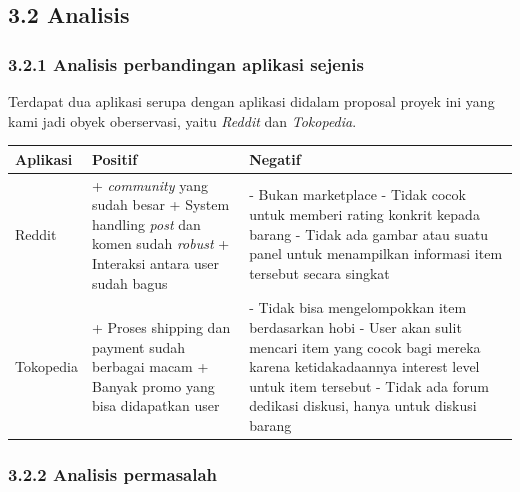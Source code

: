 \documentclass[a4paper]{article}
\begin{document}
\subsection*{3.2 Analisis}

\subsubsection*{3.2.1 Analisis perbandingan aplikasi sejenis}
Terdapat dua aplikasi serupa dengan aplikasi didalam proposal proyek ini yang kami jadi obyek oberservasi, yaitu \textit{Reddit} dan \textit{Tokopedia}.

\begin{longtable}{|m{2cm}|p{5cm}|p{5cm}|}
    \hline
    Aplikasi & Positif & Negatif \\ 
    \hline
    Reddit 
    &   + \textit{community} yang sudah besar \newline 
        + System handling \textit{post} dan komen sudah \textit{robust} \newline 
        + Interaksi antara user sudah bagus 
    &   - Bukan marketplace \newline 
        - Tidak cocok untuk memberi rating konkrit kepada barang \newline 
        - Tidak ada gambar atau suatu panel untuk menampilkan informasi item tersebut secara singkat \\ 
    \hline
    Tokopedia
    &   + Proses shipping dan payment sudah berbagai macam \newline  
        + Banyak promo yang bisa didapatkan user  
    &   - Tidak bisa mengelompokkan item berdasarkan hobi \newline 
        - User akan sulit mencari item yang cocok bagi mereka karena ketidakadaannya interest level untuk item tersebut \newline 
        - Tidak ada forum dedikasi diskusi, hanya untuk diskusi barang \\ 
    \hline
\end{longtable}


\subsubsection*{3.2.2 Analisis permasalah}
\end{document}
